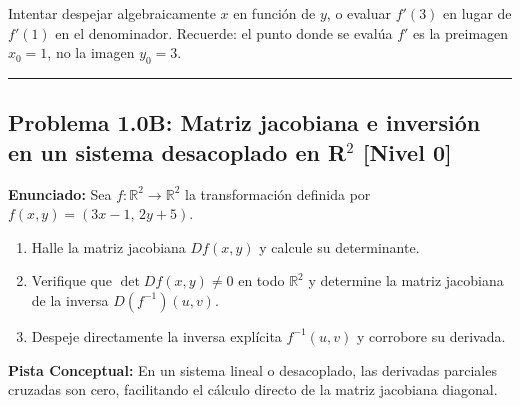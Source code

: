 \documentclass[11pt,a4paper]{article}
\begin{document}
\begin{trapbox}
Intentar despejar algebraicamente $x$ en función de $y$, o evaluar $f'(3)$ en lugar de $f'(1)$ en el denominador. Recuerde: el punto donde se evalúa $f'$ es la preimagen $x_0 = 1$, no la imagen $y_0 = 3$.
\end{trapbox}

\vspace{0.5cm}
\hrule
\vspace{0.5cm}
\subsection*{Problema 1.0B: Matriz jacobiana e inversión en un sistema desacoplado en R$^2$ \hfill \color{teal}\small[Nivel 0]}

\begin{tcolorbox}[colback=white,colframe=gray!40,arc=1mm,boxrule=0.5pt,left=3mm,right=3mm,top=2mm,bottom=2mm]
\textbf{Enunciado:} Sea $f: \mathbb{R}^2 \to \mathbb{R}^2$ la transformación definida por $f(x,y) = (3x - 1, \, 2y + 5)$.
\begin{enumerate}[label=\textbf{\alph*)}]
\item Halle la matriz jacobiana $Df(x,y)$ y calcule su determinante.
\item Verifique que $\det Df(x,y) \neq 0$ en todo $\mathbb{R}^2$ y determine la matriz jacobiana de la inversa $D(f^{-1})(u,v)$.
\item Despeje directamente la inversa explícita $f^{-1}(u,v)$ y corrobore su derivada.
\end{enumerate}
\end{tcolorbox}

\begin{tcolorbox}[colback=yellow!4,colframe=accentamber!70,arc=1mm,boxrule=0.5pt,left=3mm,right=3mm,top=1.5mm,bottom=1.5mm]
\textbf{Pista Conceptual:} En un sistema lineal o desacoplado, las derivadas parciales cruzadas son cero, facilitando el cálculo directo de la matriz jacobiana diagonal.
\end{tcolorbox}
\end{document}
